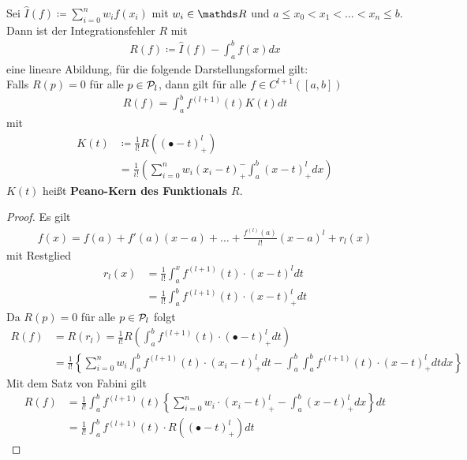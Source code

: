\begin{Satze}
  Sei $\hat{I}(f)\coloneqq \sum_{i=0}^n w_if(x_i)$ mit $w_i\in\R$ und
  $a\leq x_0<x_1<\ldots <x_n\leq b$.
  Dann ist der Integrationsfehler $R$ mit 
  \begin{gather}
    R(f) \coloneqq \hat{I}(f) - \int_a^b f(x) dx
    \label{VII.2.5}
  \end{gather}
  eine lineare Abildung, für die folgende Darstellungsformel gilt:
  \\
  Falls $R(p)=0$ für alle $p\in\mathcal{P}_l$, dann gilt 
  für alle $f\in C^{l+1}([a,b])$
  \begin{gather}
    R(f) = \int_a^bf^{(l+1)}(t) K(t) dt
    \label{VII.2.6}
  \end{gather}
  mit 
  \begin{align}\nonumber
    K(t) &\coloneqq \frac{1}{l!}
           R\left( 
           (\bullet -t)_+^l
           \right)\\
         &= \frac{1}{i!}\left( \sum_{i=0}^n w_i(x_i-t)_+^-\int_a^b(x-t)_+^ldx  \right)
           \label{VII.2.7}
  \end{align}
  $K(t)$ heißt \textbf{Peano-Kern des Funktionals
    $R$}.
  \begin{proof}
    Es gilt
    \begin{gather*}
      f(x) = f(a) + f'(a)(x-a) +\ldots + \frac{f^{(l)}(a)}{l!}(x-a)^l + r_l(x)
    \end{gather*}
    mit Restglied 
    \begin{align*}
      r_l(x) &= \frac{1}{l!} \int_a^xf^{(l+1)} (t)\cdot (x-t)^l dt\\
             &= \frac{1}{l!} \int_a^bf^{(l+1)} (t)\cdot (x-t)_+^l dt
    \end{align*}
    Da $R(p)=0$ für alle $p\in\mathcal{P}_l$ folgt
    \begin{align*}
      R(f) &= R(r_l)
             = \frac{1}{l!} R\left(\int_a^bf^{(l+1)} (t)\cdot(\bullet-t)_+^l
             dt\right)\\
           &=\frac{1}{l!}\left\{ \sum_{i=0}^n w_i \int_a^b f^{(l+1)}(t)
             \cdot (x_i-t)_+^ldt  
             - \int_a^b\int_a^b  f^{(l+1)}(t) \cdot (x-t)_+^ldtdx  \right\}
    \end{align*}
    Mit dem Satz von Fabini gilt
    \begin{align*}
      R(f) &= \frac{1}{l!}\int_a^bf^{(l+1)}(t) 
             \left\{ 
             \sum_{i=0}^n w_i  \cdot (x_i-t)_+^l  
             - \int_a^b(x-t)_+^ldx  \right\}
             dt\\
           &= \frac{1}{l!} \int_a^bf^{(l+1)}(t) 
             \cdot R\left( (\bullet -t)_+^l\right) dt    
    \end{align*}
  \end{proof}
\end{Satze}

